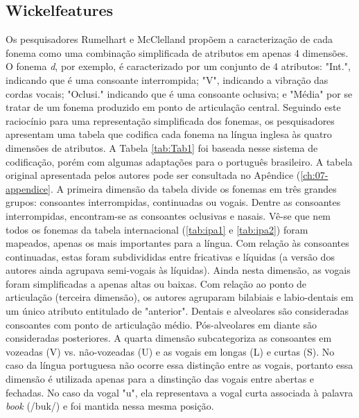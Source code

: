 \subsection{Wickelfeatures}
\label{sec:wickelfeatures}
Os pesquisadores Rumelhart e McClelland propõem a caracterização de cada fonema como uma combinação simplificada de atributos em apenas 4 dimensões. O fonema \textit{d}, por exemplo, é caracterizado por um conjunto de 4 atributos: "Int.", indicando que é uma consoante interrompida; "V", indicando a vibração das cordas vocais; "Oclusi."  indicando que é uma consoante oclusiva; e "Média" por se tratar de um fonema produzido em ponto de articulação central. Seguindo este raciocínio para uma representação simplificada dos fonemas, os pesquisadores apresentam uma tabela que codifica cada fonema na língua inglesa às quatro dimensões de atributos. A Tabela \ref{tab:Tab1} foi baseada nesse sistema de codificação, porém com algumas adaptações para o português brasileiro. A tabela original apresentada pelos autores pode ser consultada no Apêndice (\ref{ch:07-appendice}. A primeira dimensão da tabela divide os fonemas em três grandes grupos: consoantes interrompidas, continuadas ou vogais. Dentre as consoantes interrompidas, encontram-se as consoantes oclusivas e nasais. Vê-se que nem todos os fonemas da tabela internacional (\ref{tab:ipa1} e \ref{tab:ipa2}) foram mapeados, apenas os mais importantes para a língua. Com relação às consoantes continuadas, estas foram subdivididas entre fricativas e líquidas (a versão dos autores ainda agrupava semi-vogais às líquidas). Ainda nesta dimensão, as vogais foram simplificadas a apenas altas ou baixas.  Com relação ao ponto de articulação (terceira dimensão), os autores agruparam bilabiais e labio-dentais em um único atributo entitulado de "anterior". Dentais e alveolares são consideradas consoantes com ponto de articulação médio. Pós-alveolares em diante são consideradas posteriores. A quarta dimensão subcategoriza as consoantes em vozeadas (V) vs. não-vozeadas (U) e as vogais em longas (L) e curtas (S). No caso da língua portuguesa não ocorre essa distinção entre as vogais, portanto essa dimensão é utilizada apenas para a dinstinção das vogais entre abertas e fechadas. No caso da vogal "u", ela representava a vogal curta associada à palavra \textit{book} (/buk/) e foi mantida nessa mesma posição.


